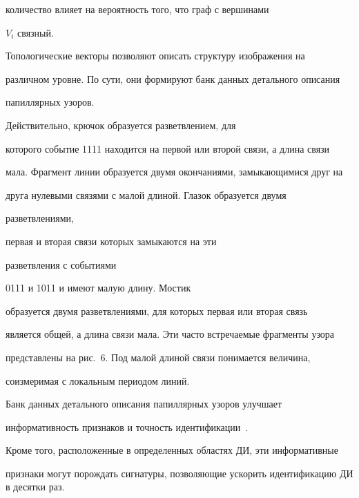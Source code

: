 \noindent


 количество влияет на вероятность того, что граф с вершинами 


$V_i$ связный.











Топологические векторы позволяют описать структуру изображения на 


различном уровне. По сути, они формируют банк данных детального описания 


папиллярных узоров. 


%


Действительно, крючок образуется разветвлением, для 


которого событие 1111 находится на первой или второй связи, а длина связи 


мала. Фрагмент линии образуется двумя окончаниями, замыкающимися друг на 


друга нулевыми связями с малой длиной. Глазок образуется двумя 


разветвлениями,


первая и вторая связи которых замыкаются на эти 


разветвления с событиями


 0111 и 1011 и имеют малую длину. Мостик 


образуется двумя разветвлениями, для которых первая или вторая связь 


является общей, а длина связи мала. Эти часто встречаемые фрагменты узора 


пред\-став\-ле\-ны на рис.~6. Под малой длиной связи понимается величина, 


соизмеримая с локальным периодом линий.








  Банк данных детального описания папиллярных узоров улучшает 


информативность признаков и точность идентификации~\cite{4-ush, 3-ush}. 





Кроме того, расположенные в определенных областях ДИ, эти информативные 


признаки могут порождать сигнатуры, позволяющие ускорить идентификацию  ДИ в десятки раз.





